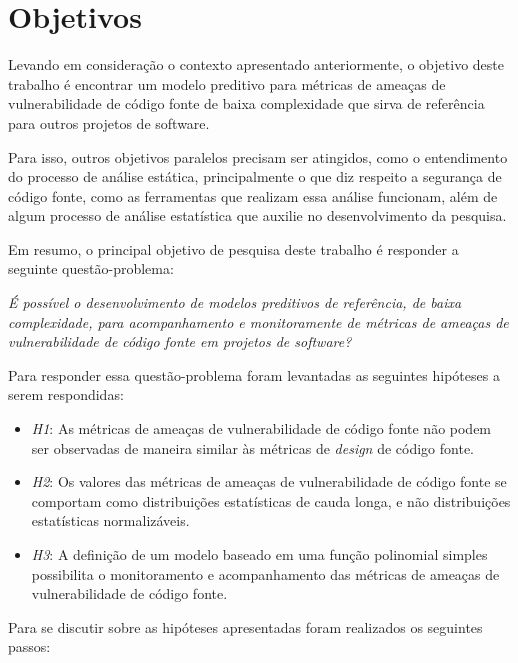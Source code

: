 \section{Objetivos} \label{sec:objetivos}

Levando em consideração o contexto apresentado anteriormente, o objetivo deste
trabalho é encontrar um modelo preditivo para métricas de ameaças de
vulnerabilidade de código fonte de baixa complexidade que sirva de referência
para outros projetos de software.

Para isso, outros objetivos paralelos precisam ser atingidos, como o
entendimento do processo de análise estática, principalmente o que diz respeito
a segurança de código fonte, como as ferramentas que realizam essa análise
funcionam, além de algum processo de análise estatística que auxilie no
desenvolvimento da pesquisa.

Em resumo, o principal objetivo de pesquisa deste trabalho é responder a
seguinte questão-problema:

\begin{center}
  \textit{É possível o desenvolvimento de modelos preditivos de referência, de
  baixa complexidade, para acompanhamento e monitoramente de métricas de ameaças
de vulnerabilidade de código fonte em projetos de software?}
\end{center}

Para responder essa questão-problema foram levantadas as seguintes hipóteses
a serem respondidas:

\begin{itemize}
  \item \textit{H1}: As métricas de ameaças de vulnerabilidade de código fonte
  não podem ser observadas de maneira similar às métricas de \textit{design} de código
  fonte.

  \item \textit{H2}: Os valores das métricas de ameaças de vulnerabilidade de
    código fonte se comportam como distribuições estatísticas de cauda longa, e
    não distribuições estatísticas normalizáveis.

  \item \textit{H3}: A definição de um modelo baseado em uma função polinomial
   simples possibilita o monitoramento e acompanhamento das métricas de ameaças
   de vulnerabilidade de código fonte.
\end{itemize}

Para se discutir sobre as hipóteses apresentadas foram realizados os seguintes
passos:

